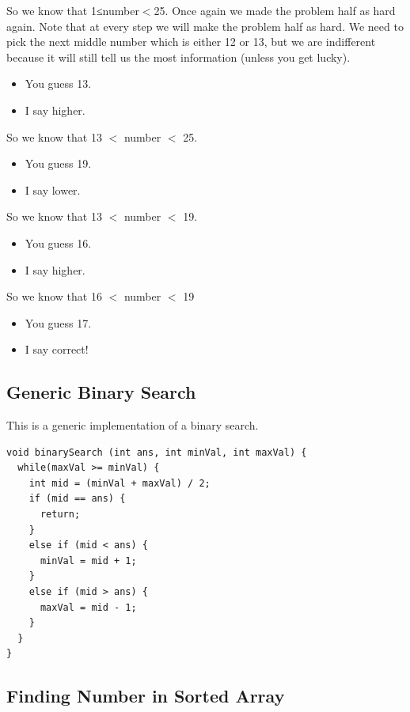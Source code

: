 \documentclass[11pt,oneside]{book}
\begin{document}
So we know that 1≤number$<$25. Once again we made the problem half as hard again. Note that at every step we will make the problem half as hard. We need to pick the next middle number which is either 12 or 13, but we are indifferent because it will still tell us the most information (unless you get lucky).

\begin{itemize}
\item You guess 13.
\item I say higher.
\end{itemize}

So we know that 13 $<$ number $<$ 25.

\begin{itemize}
\item You guess 19.
\item I say lower.
\end{itemize}

So we know that 13 $<$ number $<$ 19.

\begin{itemize}
\item You guess 16.
\item I say higher.
\end{itemize}

So we know that 16 $<$ number $<$ 19

\begin{itemize}
\item You guess 17.
\item I say correct!
\end{itemize}

\subsection{Generic Binary Search}

This is a generic implementation of a binary search.

\begin{lstlisting}
void binarySearch (int ans, int minVal, int maxVal) {
  while(maxVal >= minVal) {
    int mid = (minVal + maxVal) / 2;
    if (mid == ans) {
      return;
    }
    else if (mid < ans) {
      minVal = mid + 1;
    } 
    else if (mid > ans) {
      maxVal = mid - 1;
    }
  }
}
\end{lstlisting}

\subsection{Finding Number in Sorted Array}
\end{document}
